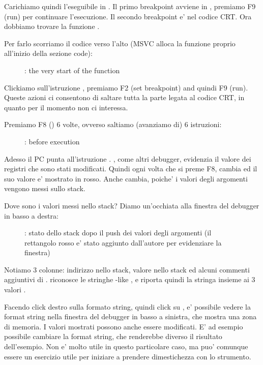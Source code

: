 Carichiamo quindi l'eseguibile in \olly.
Il primo breakpoint avviene in , premiamo F9 (run) per continuare l'esecuzione. 
Il secondo breakpoint e' nel codice \ac{CRT}.
Ora dobbiamo trovare la funzione \main.

Per farlo scorriamo il codice verso l'alto (MSVC alloca la funzione \main proprio all'inizio della sezione code): 
\begin{figure}[H]
\centering
{}
\caption{\olly: the very start of the \main function}
\label{fig:printf3_olly_1}
\end{figure}

Clickiamo sull'istruzione , premiamo F2 (set breakpoint) and quindi F9 (run).
Queste azioni ci consentono di saltare tutta la parte legata al codice \ac{CRT}, in quanto per il momento non ci interessa.

\clearpage
Premiamo F8 (\stepover) 6 volte, ovverso saltiamo (avanziamo di) 6 istruzioni:

\begin{figure}[H]
\centering
{}
\caption{\olly: before \printf execution}
\label{fig:printf3_olly_2}
\end{figure}

Adesso il \ac{PC} punta all'istruzione .
\olly, come altri debugger, evidenzia il valore dei registri che sono stati modificati.
Quindi ogni volta che si preme F8, \EIP cambia ed il suo valore e' mostrato in rosso.
Anche \ESP cambia, poiche' i valori degli argomenti vengono messi sullo stack.

Dove sono i valori messi nello stack?
Diamo un'occhiata alla finestra del debugger in basso a destra:

\begin{figure}[H]
\centering
{}
\caption{\olly: stato dello stack dopo il push dei valori degli argomenti (il rettangolo rosso e' stato aggiunto dall'autore per evidenziare la finestra)}
\end{figure}

Notiamo 3 colonne: indirizzo nello stack, valore nello stack ed alcuni commenti aggiuntivi di \olly. 
\olly riconosce le stringhe \printf{}-like , e riporta quindi la stringa insieme ai 3 valori .

Facendo click destro sulla formato string, quindi click su ,
e' possibile vedere la format string nella finestra del debugger in basso a sinistra, che mostra una zona di memoria.
I valori mostrati possono anche essere modificati.
E' ad esempio possibile cambiare la format string, che renderebbe diverso il risultato dell'esempio.
Non e' molto utile in questo particolare caso, ma puo' comunque essere un esercizio utile per iniziare a prendere dimestichezza con lo strumento.

